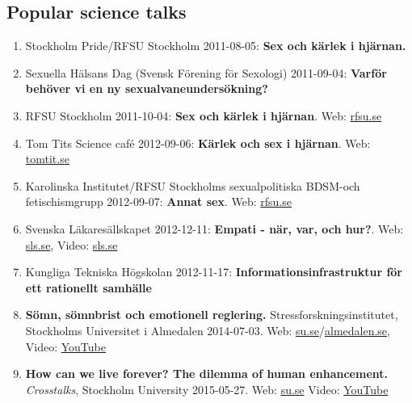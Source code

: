\documentclass[10pt]{article}
\begin{document}
\subsection*{Popular science talks}
\begin{enumerate}[nolistsep]
\item Stockholm Pride/RFSU Stockholm 2011-08-05: {\bf Sex och kärlek i hjärnan.}
\item Sexuella Hälsans Dag (Svensk Förening för Sexologi) 2011-09-04: {\bf Varför behöver vi en ny sexualvaneundersökning?}
\item RFSU Stockholm 2011-10-04: {\bf Sex och kärlek i hjärnan}.
Web: \href{http://www.rfsu.se/sv/RFSU-nara-dig/RFSU-Stockholm/Nyhetsbrev/Nyhetsbrev-52011/Medlemskvall-4-okt-Sex-och-karlek-i-hjarnan/}{rfsu.se}
\item Tom Tits Science café 2012-09-06: {\bf Kärlek och sex i hjärnan}.
Web: \href{http://test.tomtit.se/event-konferens/Science-cafe/}{tomtit.se}
\item Karolinska Institutet/RFSU Stockholms sexualpolitiska BDSM-och fetischismgrupp 2012-09-07: {\bf Annat sex}.
Web: \href{http://www.rfsu.se/sv/RFSU-nara-dig/RFSU-Stockholm/Nyhetsbrev/Nyhetsbrev-82012/Uppskattad-och-normvidgande-temadag-pa-Karolinska-Institutet-/}{rfsu.se}
\item Svenska Läkaresällskapet 2012-12-11: {\bf Empati - när, var, och hur?}.
Web: \href{http://www.sls.se/Utbildning/Webb-tv/Tisdagar-2012/}{sls.se}, Video: \href{http://79.136.112.58/ability/show/qks/sls11dec12/speed.asp}{sls.se}
\item Kungliga Tekniska Högskolan 2012-11-17: {\bf Informationsinfrastruktur för ett rationellt samhälle}
\item {\bf Sömn, sömnbrist och emotionell reglering.} Stressforskningsinstitutet, Stockholms Universitet i Almedalen 2014-07-03.
Web: \href{http://www.stressforskning.su.se/om-oss/evenemang/arbete-och-\%C3\%A5terh\%C3\%A4mtning-nya-id\%C3\%A9er-om-hur-stress-s\%C3\%B6mn-\%C3\%A5lder-och-arbetstider-h\%C3\%A4nger-ihop-1.177394}{su.se}/\href{http://www.almedalsveckan.info/19109}{almedalen.se},
Video: \href{https://www.youtube.com/watch?v=wq2C_KNrn-8}{YouTube}
\item \textbf{How can we live forever? The dilemma of human enhancement.} \textit{Crosstalks}, Stockholm University 2015-05-27.
Web: \href{http://www.su.se/english/society-and-business/conversations-on-research/how-can-we-live-forever-1.245569}{su.se}
Video: \href{https://www.youtube.com/watch?v=74irIhJVKK8\&index=32\&list=PLvm-fAk-DoHVR6aWtbjW3oX9J7\_3KIhH3}{YouTube}

\end{enumerate}
\end{document}
